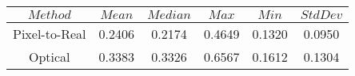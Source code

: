 \begin{table}[h]
\centering
\begin{tabular}{|c|c|c|c|c|c|}
\hline
$Method$ & $Mean$ & $Median$ & $Max$ & $Min$ & $StdDev$ \\
\hline
Pixel-to-Real & 0.2406 & 0.2174 & 0.4649 & 0.1320 & 0.0950 \\
\hline
Optical & 0.3383 & 0.3326 & 0.6567 & 0.1612 & 0.1304 \\
\hline
\end{tabular}
\end{table}
